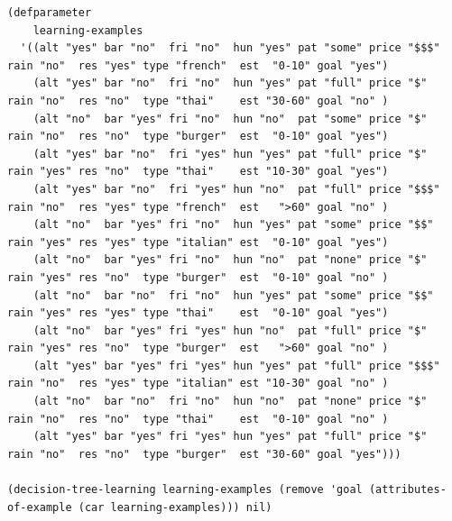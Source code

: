 \documentclass[a4paper,12pt]{article}
\begin{document}
\lstset{language=Lisp,label= ,caption= ,captionpos=b,numbers=none}
\begin{lstlisting}
(defparameter
    learning-examples
  '((alt "yes" bar "no"  fri "no"  hun "yes" pat "some" price "$$$" rain "no"  res "yes" type "french"  est  "0-10" goal "yes")
    (alt "yes" bar "no"  fri "no"  hun "yes" pat "full" price "$"   rain "no"  res "no"  type "thai"    est "30-60" goal "no" )
    (alt "no"  bar "yes" fri "no"  hun "no"  pat "some" price "$"   rain "no"  res "no"  type "burger"  est  "0-10" goal "yes")
    (alt "yes" bar "no"  fri "yes" hun "yes" pat "full" price "$"   rain "yes" res "no"  type "thai"    est "10-30" goal "yes")
    (alt "yes" bar "no"  fri "yes" hun "no"  pat "full" price "$$$" rain "no"  res "yes" type "french"  est   ">60" goal "no" )
    (alt "no"  bar "yes" fri "no"  hun "yes" pat "some" price "$$"  rain "yes" res "yes" type "italian" est  "0-10" goal "yes")
    (alt "no"  bar "yes" fri "no"  hun "no"  pat "none" price "$"   rain "yes" res "no"  type "burger"  est  "0-10" goal "no" )
    (alt "no"  bar "no"  fri "no"  hun "yes" pat "some" price "$$"  rain "yes" res "yes" type "thai"    est  "0-10" goal "yes")
    (alt "no"  bar "yes" fri "yes" hun "no"  pat "full" price "$"   rain "yes" res "no"  type "burger"  est   ">60" goal "no" )
    (alt "yes" bar "yes" fri "yes" hun "yes" pat "full" price "$$$" rain "no"  res "yes" type "italian" est "10-30" goal "no" )
    (alt "no"  bar "no"  fri "no"  hun "no"  pat "none" price "$"   rain "no"  res "no"  type "thai"    est  "0-10" goal "no" )
    (alt "yes" bar "yes" fri "yes" hun "yes" pat "full" price "$"   rain "no"  res "no"  type "burger"  est "30-60" goal "yes")))

(decision-tree-learning learning-examples (remove 'goal (attributes-of-example (car learning-examples))) nil)
\end{lstlisting}
\end{document}
